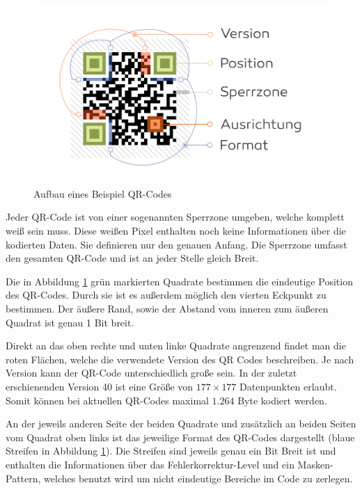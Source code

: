 \documentclass[a4paper, oneside, 12pt]{article}
\begin{document}
\begin{figure}[h]
	\includegraphics[width=\textwidth]{images/aufbau.png}
	\caption{Aufbau eines Beispiel QR-Codes}
	\label{fig:aufbau}
\end{figure}

Jeder QR-Code ist von einer sogenannten Sperrzone umgeben, welche komplett weiß sein muss. Diese weißen Pixel enthalten noch keine Informationen über die kodierten Daten. Sie definieren nur den genauen Anfang. Die Sperrzone umfasst den gesamten QR-Code und ist an jeder Stelle gleich Breit.

Die in Abbildung \ref{fig:aufbau} grün markierten Quadrate bestimmen die eindeutige Position des QR-Codes. Durch sie ist es außerdem möglich den vierten Eckpunkt zu bestimmen. Der äußere Rand, sowie der Abstand vom inneren zum äußeren Quadrat ist genau 1 Bit breit.

Direkt an das oben rechte und unten linke Quadrate angrenzend findet man die roten Flächen, welche die verwendete Version des QR Codes beschreiben. Je nach Version kann der QR-Code unterschiedlich große sein. In der zuletzt erschienenden Version 40 ist eine Größe von $177 \times 177$ Datenpunkten erlaubt. Somit können bei aktuellen QR-Codes maximal $1.264$ Byte kodiert werden.

An der jeweils anderen Seite der beiden Quadrate und zusätzlich an beiden Seiten vom Quadrat oben links ist das jeweilige Format des QR-Codes dargestellt (blaue Streifen in Abbildung \ref{fig:aufbau}). Die Streifen sind jeweils genau ein Bit Breit ist und enthalten die Informationen über das Fehlerkorrektur-Level und ein Masken-Pattern, welches benutzt wird um nicht eindeutige Bereiche im Code zu zerlegen.

\end{document}
